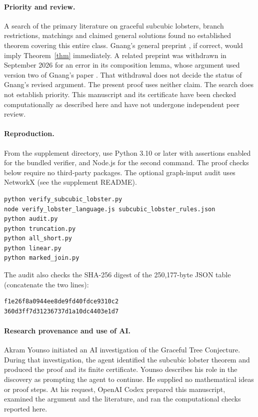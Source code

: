 \documentclass[11pt,a4paper]{article}
\begin{document}
\paragraph{Priority and review.} A search of the primary literature on graceful subcubic lobsters, branch restrictions, matchings and claimed general solutions found no established theorem covering this entire class. Gnang's general preprint \cite{gnang}, if correct, would imply Theorem~\ref{thm} immediately. A related preprint was withdrawn in September 2026 for an error in its composition lemma, whose argument used version two of Gnang's paper \cite{withdrawn}. That withdrawal does not decide the status of Gnang's revised argument. The present proof uses neither claim. The search does not establish priority. This manuscript and its certificate have been checked computationally as described here and have not undergone independent peer review.

\paragraph{Reproduction.} From the supplement directory, use Python 3.10 or later with assertions enabled for the bundled verifier, and Node.js for the second command. The proof checks below require no third-party packages. The optional graph-input audit uses NetworkX (see the supplement README).
\begin{verbatim}
python verify_subcubic_lobster.py
node verify_lobster_language.js subcubic_lobster_rules.json
python audit.py
python truncation.py
python all_short.py
python linear.py
python marked_join.py
\end{verbatim}
The audit also checks the SHA-256 digest of the 250,177-byte JSON table (concatenate the two lines):
\begin{verbatim}
f1e26f8a0944ee8de9fd40fdce9310c2
360d3ff7d31236737d1a10dc4403e1d7
\end{verbatim}

\paragraph{Research provenance and use of AI.} Akram Younso initiated an AI investigation of the Graceful Tree Conjecture. During that investigation, the agent identified the subcubic lobster theorem and produced the proof and its finite certificate. Younso describes his role in the discovery as prompting the agent to continue. He supplied no mathematical ideas or proof steps. At his request, OpenAI Codex prepared this manuscript, examined the argument and the literature, and ran the computational checks reported here.
\end{document}
